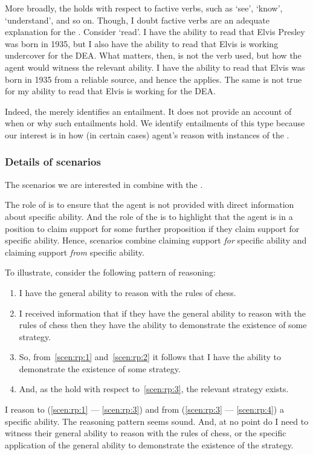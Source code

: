 \begin{note}[\aben{}]
  More broadly, the \aben{} holds with respect to factive verbs, such as `see', `know', `understand', and so on.
  Though, I doubt factive verbs are an adequate explanation for the \aben{}.
  Consider `read'.
  I have the ability to read that Elvis Presley was born in 1935, but I also have the ability to read that Elvis is working undercover for the DEA.
  What matters, then, is not the verb used, but how the agent would witness the relevant ability.
  I have the ability to read that Elvis was born in 1935 from a reliable source, and hence the \aben{} applies.
  The same is not true for my ability to read that Elvis is working for the DEA.

  Indeed, the \aben{} merely identifies an entailment.
  It does not provide an account of when or why such entailments hold.
  We identify entailments of this type because our interest is in how (in certain cases) agent's reason with instances of the \aben{}.
\end{note}

\subsubsection{Details of scenarios}
\label{sec:scenarios}

\begin{note}
  The scenarios we are interested in combine \gsi{} with the \aben{}.

  The role of \gsi{} is to ensure that the agent is not provided with direct information about specific ability.
  And the role of the \aben{} is to highlight that the agent is in a position to claim support for some further proposition if they claim support for specific ability.
  Hence, scenarios combine claiming support \emph{for} specific ability and claiming support \emph{from} specific ability.

  To illustrate, consider the following pattern of reasoning:
  \begin{enumerate}[label=\arabic*., ref=(\arabic*)]
  \item\label{scen:rp:1} I have the general ability to reason with the rules of chess.
  \item\label{scen:rp:2} I received \gsi{} information that if they have the general ability to reason with the rules of chess then they have the ability to demonstrate the existence of some strategy.
  \item\label{scen:rp:3} So, from~\ref{scen:rp:1} and~\ref{scen:rp:2} it follows that I have the ability to demonstrate the existence of some strategy.
  \item\label{scen:rp:4} And, as the \aben{} hold with respect to~\ref{scen:rp:3}, the relevant strategy exists.
  \end{enumerate}
  I reason to (\ref{scen:rp:1} --- \ref{scen:rp:3}) and from (\ref{scen:rp:3} --- \ref{scen:rp:4}) a specific ability.
  The reasoning pattern seems sound.
  And, at no point do I need to witness their general ability to reason with the rules of chess, or the specific application of the general ability to demonstrate the existence of the strategy.
\end{note}

